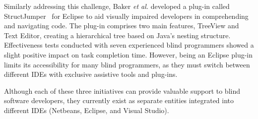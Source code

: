 Similarly addressing this challenge, Baker {\em et al.} developed a
plug-in called StructJumper~\cite{BakerML15} for Eclipse to aid
visually impaired developers in comprehending and navigating code. The
plug-in comprises two main features, TreeView and Text Editor,
creating a hierarchical tree based on Java's nesting
structure. Effectiveness tests conducted with seven experienced blind
programmers showed a slight positive impact on task completion time.
However, being an Eclipse plug-in limits its accessibility for many blind programmers, as they must switch between different IDEs with exclusive assistive tools and plug-ins.

Although each of these three initiatives can provide valuable support
to blind software developers, they currently exist as separate
entities integrated into different IDEs (Netbeans, Eclipse, and Visual
Studio).

